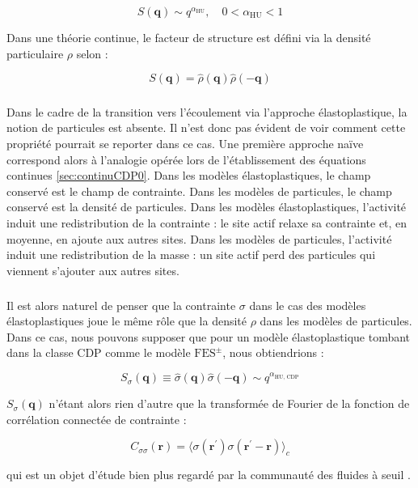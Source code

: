 \begin{equation}
	S(\mathbf{q})\sim q^{\alpha_\text{HU}}, \quad 0<\alpha_\text{HU}<1
\end{equation}

\noindent Dans une théorie continue, le facteur de structure est défini via la densité particulaire $\rho$ selon :

\begin{equation}
	S(\mathbf{q}) =  \hat{\rho}(\mathbf{q})\hat{\rho}(\mathbf{-q})
\end{equation}

\subparagraph{}Dans le cadre de la transition vers l'écoulement via l'approche élastoplastique, la notion de particules est absente. Il n'est donc pas évident de voir comment cette propriété pourrait se reporter dans ce cas. Une première approche naïve correspond alors à l'analogie opérée lors de l'établissement des équations continues \autoref{sec:continuCDP0}. Dans les modèles élastoplastiques, le champ conservé est le champ de contrainte. Dans les modèles de particules, le champ conservé est la densité de particules. Dans les modèles élastoplastiques, l'activité induit une redistribution de la contrainte : le site actif relaxe sa contrainte et, en moyenne, en ajoute aux autres sites. Dans les modèles de particules, l'activité induit une redistribution de la masse : un site actif perd des particules qui viennent s'ajouter aux autres sites.

\subparagraph{}Il est alors naturel de penser que la contrainte $\sigma$ dans le cas des modèles élastoplastiques joue le même rôle que la densité $\rho$ dans les modèles de particules. Dans ce cas, nous pouvons supposer que pour un modèle élastoplastique tombant dans la classe CDP comme le modèle $\text{FES}^\pm$, nous obtiendrions :

\begin{equation}
	S_\sigma(\mathbf{q}) \equiv \hat{\sigma}(\mathbf{q})\hat{\sigma}(\mathbf{-q}) \sim q^{\alpha_\text{HU, CDP}}
\end{equation}

\noindent $S_\sigma(\mathbf{q})$ n'étant alors rien d'autre que la transformée de Fourier de la fonction de corrélation connectée de contrainte :

\begin{equation}
	C_{\sigma\sigma}(\mathbf{r}) = \langle \sigma(\mathbf{r^\prime})\sigma(\mathbf{\mathbf{r}^\prime-\mathbf{r}})\rangle_c
\end{equation}

\noindent qui est un objet d'étude bien plus regardé par la communauté des fluides à seuil \cite{chowdhury_long_2016, maier_emergence_2017, lerner_simple_2020}.

